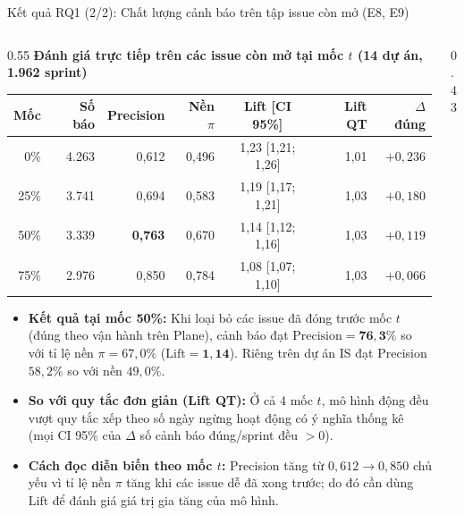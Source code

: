 \begin{frame}{Kết quả RQ1 (2/2): Chất lượng cảnh báo trên tập issue còn mở (E8, E9)}
  \scriptsize
  \begin{columns}[T,onlytextwidth]
    \begin{column}{0.55\textwidth}
      \textbf{Đánh giá trực tiếp trên các issue còn mở tại mốc $t$ (14 dự án, 1.962 sprint)}
      \vspace{0.04cm}
      \setlength{\tabcolsep}{3pt}
      \renewcommand{\arraystretch}{1.15}
      \begin{tabular}{r|r|r|r|c|r|r}
        \textbf{Mốc} & \textbf{Số báo} & \textbf{Precision} & \textbf{Nền $\pi$} & \textbf{Lift [CI 95\%]} & \textbf{Lift QT} & \textbf{$\Delta$ đúng} \\
        \hline
        0\% & 4.263 & 0,612 & 0,496 & \alert{1,23} [1,21; 1,26] & 1,01 & $+0{,}236$ \\
        25\% & 3.741 & 0,694 & 0,583 & \alert{1,19} [1,17; 1,21] & 1,03 & $+0{,}180$ \\
        50\% & 3.339 & \textbf{0,763} & 0,670 & \alert{1,14} [1,12; 1,16] & 1,03 & $+0{,}119$ \\
        75\% & 2.976 & 0,850 & 0,784 & \alert{1,08} [1,07; 1,10] & 1,03 & $+0{,}066$ \\
      \end{tabular}
      \vspace{0.08cm}
      \begin{itemize}
        \setlength{\itemsep}{2pt}
        \item \textbf{Kết quả tại mốc 50\%:} Khi loại bỏ các issue đã đóng trước mốc $t$ (đúng theo vận hành trên Plane), cảnh báo đạt $\text{Precision} = \mathbf{76{,}3\%}$ so với tỉ lệ nền $\pi = 67{,}0\%$ ($\text{Lift} = \mathbf{1{,}14}$). Riêng trên dự án IS đạt Precision $58{,}2\%$ so với nền $49{,}0\%$.
        \item \textbf{So với quy tắc đơn giản (Lift QT):} Ở cả 4 mốc $t$, mô hình động đều vượt quy tắc xếp theo số ngày ngừng hoạt động có ý nghĩa thống kê (mọi CI 95\% của $\Delta$ số cảnh báo đúng/sprint đều $> 0$).
        \item \textbf{Cách đọc diễn biến theo mốc $t$:} Precision tăng từ $0{,}612 \to 0{,}850$ chủ yếu vì tỉ lệ nền $\pi$ tăng khi các issue dễ đã xong trước; do đó cần dùng $\text{Lift}$ để đánh giá giá trị gia tăng của mô hình.
      \end{itemize}
    \end{column}
    \begin{column}{0.43\textwidth}

\end{column}
\end{columns}
\end{frame}
